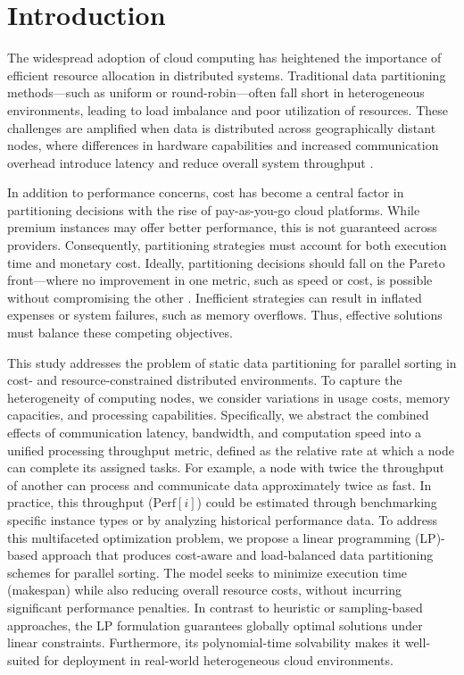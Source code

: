 \documentclass[]{interact}
\theoremstyle{plain}
\theoremstyle{definition}
\theoremstyle{remark}
\begin{document}
\section{Introduction}
The widespread adoption of cloud computing has heightened the importance of efficient resource allocation in distributed systems. Traditional data partitioning methods—such as uniform or round-robin—often fall short in heterogeneous environments, leading to load imbalance and poor utilization of resources. These challenges are amplified when data is distributed across geographically distant nodes, where differences in hardware capabilities and increased communication overhead introduce latency and reduce overall system throughput \cite{yoon_optimal_2014}.

In addition to performance concerns, cost has become a central factor in partitioning decisions with the rise of pay-as-you-go cloud platforms. While premium instances may offer better performance, this is not guaranteed across providers. Consequently, partitioning strategies must account for both execution time and monetary cost. Ideally, partitioning decisions should fall on the Pareto front—where no improvement in one metric, such as speed or cost, is possible without compromising the other \cite{yoon_optimal_2014}. Inefficient strategies can result in inflated expenses or system failures, such as memory overflows. Thus, effective solutions must balance these competing objectives.

This study addresses the problem of static data partitioning for parallel sorting in cost- and resource-constrained distributed environments. To capture the heterogeneity of computing nodes, we consider variations in usage costs, memory capacities, and processing capabilities. Specifically, we abstract the combined effects of communication latency, bandwidth, and computation speed into a unified processing throughput metric, defined as the relative rate at which a node can complete its assigned tasks. For example, a node with twice the throughput of another can process and communicate data approximately twice as fast. In practice, this throughput ($\text{Perf}[i]$) could be estimated through benchmarking specific instance types or by analyzing historical performance data. To address this multifaceted optimization problem, we propose a linear programming (LP)-based approach that produces cost-aware and load-balanced data partitioning schemes for parallel sorting. The model seeks to minimize execution time (makespan) while also reducing overall resource costs, without incurring significant performance penalties. In contrast to heuristic or sampling-based approaches, the LP formulation guarantees globally optimal solutions under linear constraints. Furthermore, its polynomial-time solvability \cite{terlaky_lp_2011} makes it well-suited for deployment in real-world heterogeneous cloud environments.
\end{document}
